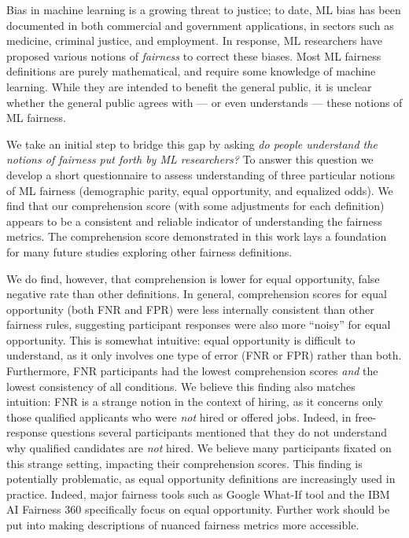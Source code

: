 \documentclass{article}
\begin{document}
Bias in machine learning is a growing threat to justice; to date, ML bias has been documented in both commercial and government applications, in sectors such as medicine, criminal justice, and employment. In response, ML researchers have proposed various notions of \emph{fairness} to correct these biases. Most ML fairness definitions are purely mathematical, and require some knowledge of machine learning. While they are intended to benefit the general public, it is unclear whether the general public agrees with --- or even understands --- these notions of ML fairness.

We take an initial step to bridge this gap by asking \emph{do people understand the notions of fairness put forth by ML researchers?} To answer this question we develop a short questionnaire to assess understanding of three particular notions of ML fairness (demographic parity, equal opportunity, and equalized odds). We find that our comprehension score (with some adjustments for each definition) appears to be a consistent and reliable indicator of understanding the fairness metrics. 
The comprehension score demonstrated in this work lays a foundation for many future studies exploring other fairness definitions.

We do find, however, that comprehension is lower for equal opportunity, false negative rate than other definitions. 
In general, comprehension scores for equal opportunity (both FNR and FPR) were less internally consistent than other fairness rules, suggesting  participant responses were also more ``noisy'' for equal opportunity.
This is somewhat intuitive: equal opportunity is difficult to understand, as it only involves one type of error (FNR or FPR) rather than both.
Furthermore, FNR participants had the lowest comprehension scores \emph{and} the lowest consistency of all conditions.
We believe this finding also matches intuition: FNR is a strange notion in the context of hiring, as it concerns only those qualified applicants who were \emph{not} hired or offered jobs.
Indeed, in free-response questions several participants mentioned that they do not understand why qualified candidates are \emph{not} hired.
We believe many participants fixated on this strange setting, impacting their comprehension scores.
This finding is potentially problematic, as equal opportunity definitions are increasingly used in practice. Indeed, major fairness tools such as Google What-If tool \cite{wexler2019if} and the IBM AI Fairness 360 \cite{bellamy2019ai} specifically focus on equal opportunity. Further work should be put into making descriptions of nuanced fairness metrics more accessible.
\end{document}

